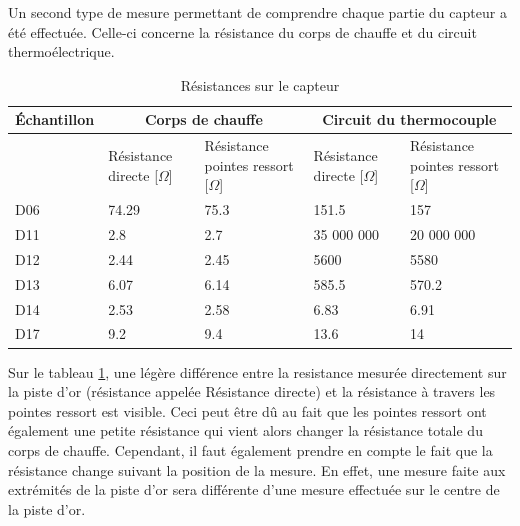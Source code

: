 Un second type de mesure permettant de comprendre chaque partie du \gls{capteur} a été effectuée. Celle-ci concerne la résistance du corps de
chauffe et du circuit thermoélectrique.
\begin{table}[H]
    \begin{center}
        \begin{tabular}{|p{2cm}|p{2.5cm}|p{2.5cm}|p{2.5cm}|p{2.5cm}|}
            \hline
            Échantillon & \multicolumn{2}{|c|}{Corps de chauffe} & \multicolumn{2}{|c|}{Circuit du thermocouple}                                                                         \\
            \hline
                        & Résistance directe [$\Omega$]          & Résistance pointes ressort [$\Omega$]         & Résistance directe [$\Omega$] & Résistance pointes ressort [$\Omega$] \\
            \hline
            D06         & 74.29                                  & 75.3                                          & 151.5                         & 157                                   \\
            \hline
            D11         & 2.8                                    & 2.7                                           & 35 000 000                    & 20 000 000                            \\
            \hline
            D12         & 2.44                                   & 2.45                                          & 5600                          & 5580                                  \\
            \hline
            D13         & 6.07                                   & 6.14                                          & 585.5                         & 570.2                                 \\
            \hline
            D14         & 2.53                                   & 2.58                                          & 6.83                          & 6.91                                  \\
            \hline
            D17         & 9.2                                    & 9.4                                           & 13.6                          & 14                                    \\
            \hline
        \end{tabular}
        \caption{Résistances sur le capteur}
        \label{tab:resistancePointeRessort}
    \end{center}
\end{table}
Sur le tableau \ref*{tab:resistancePointeRessort}, une légère différence entre la resistance mesurée directement sur la piste d'or (résistance 
appelée Résistance directe) et la résistance à travers les pointes ressort est visible. Ceci peut être dû au fait que les pointes ressort ont 
également une petite résistance qui vient alors changer la résistance totale du corps de chauffe. Cependant, il faut également prendre en 
compte le fait que la résistance change suivant la position de la mesure. En effet, une mesure faite aux extrémités de la piste d'or sera différente 
d'une mesure effectuée sur le centre de la piste d'or. 

